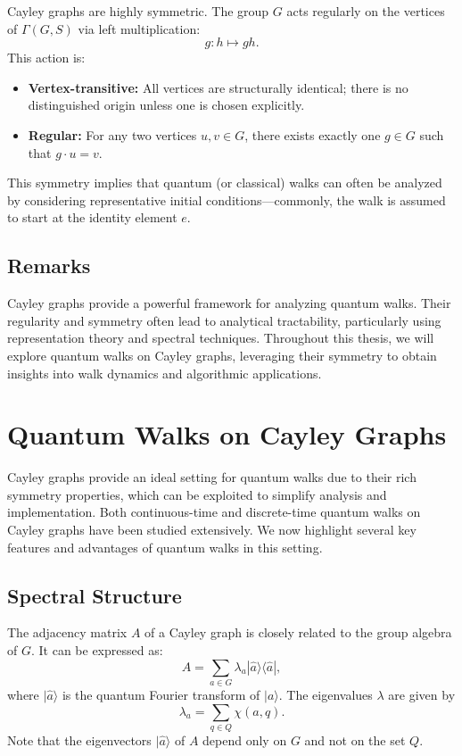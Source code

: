 \documentclass[12pt]{report}
\begin{document}
Cayley graphs are highly symmetric. The group $G$ acts regularly on the vertices of $\Gamma(G, S)$ via left multiplication:
\[
g : h \mapsto gh.
\]
This action is:
\begin{itemize}
    \item \textbf{Vertex-transitive:} All vertices are structurally identical; there is no distinguished origin unless one is chosen explicitly.
    \item \textbf{Regular:} For any two vertices $u, v \in G$, there exists exactly one $g \in G$ such that $g \cdot u = v$.
\end{itemize}

This symmetry implies that quantum (or classical) walks can often be analyzed by considering representative initial conditions—commonly, the walk is assumed to start at the identity element $e$.

\subsection{Remarks}

Cayley graphs provide a powerful framework for analyzing quantum walks. Their regularity and symmetry often lead to analytical tractability, particularly using representation theory and spectral techniques. Throughout this thesis, we will explore quantum walks on Cayley graphs, leveraging their symmetry to obtain insights into walk dynamics and algorithmic applications.







\section{Quantum Walks on Cayley Graphs}


Cayley graphs provide an ideal setting for quantum walks due to their rich symmetry properties, which can be exploited to simplify analysis and implementation. Both continuous-time and discrete-time quantum walks on Cayley graphs have been studied extensively. We now highlight several key features and advantages of quantum walks in this setting.


\subsection{Spectral Structure}

The adjacency matrix $A$ of a Cayley graph is closely related to the group algebra of $G$. It can be expressed as:
\[
A = \sum_{a \in G} \lambda_a |\hat{a}\rangle \langle \hat{a}|,
\]
where $|\hat{a}\rangle$ is the quantum Fourier transform of $|a\rangle$. The eigenvalues $\lambda$ are given by
\[
\lambda_a = \sum_{q \in Q} \chi(a, q).
\]
Note that the eigenvectors $|\hat{a}\rangle$ of $A$ depend only on $G$ and not on the set $Q$.
\end{document}
